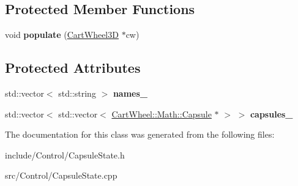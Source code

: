 \subsection*{Protected Member Functions}
\begin{DoxyCompactItemize}
\item 
\hypertarget{classCartWheel_1_1CapsuleState_a3385b017b42e48013628fb64dcd82d84}{
void {\bfseries populate} (\hyperlink{classCartWheel_1_1CartWheel3D}{CartWheel3D} $\ast$cw)}
\label{classCartWheel_1_1CapsuleState_a3385b017b42e48013628fb64dcd82d84}

\end{DoxyCompactItemize}
\subsection*{Protected Attributes}
\begin{DoxyCompactItemize}
\item 
\hypertarget{classCartWheel_1_1CapsuleState_ad0d3aaf856d0f823ad13ac91dfca0f7e}{
std::vector$<$ std::string $>$ {\bfseries names\_\-}}
\label{classCartWheel_1_1CapsuleState_ad0d3aaf856d0f823ad13ac91dfca0f7e}

\item 
\hypertarget{classCartWheel_1_1CapsuleState_af08fa0803a61d70d50c2312c73969ea5}{
std::vector$<$ std::vector$<$ \hyperlink{classCartWheel_1_1Math_1_1Capsule}{CartWheel::Math::Capsule} $\ast$ $>$ $>$ {\bfseries capsules\_\-}}
\label{classCartWheel_1_1CapsuleState_af08fa0803a61d70d50c2312c73969ea5}

\end{DoxyCompactItemize}


The documentation for this class was generated from the following files:\begin{DoxyCompactItemize}
\item 
include/Control/CapsuleState.h\item 
src/Control/CapsuleState.cpp\end{DoxyCompactItemize}
